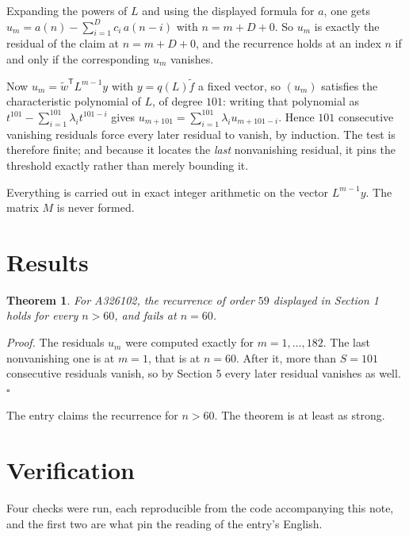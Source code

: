 \documentclass[11pt]{article}
\newtheorem{theorem}{Theorem}
\theoremstyle{definition}
\begin{document}
Expanding the powers of $L$ and using the displayed formula for $a$, one gets $u_m = a(n) - \sum_{i=1}^{D} c_i\,a(n-i)$ with $n = m + D + 0$. So $u_m$ is exactly the residual of the claim at $n = m + D + 0$, and the recurrence holds at an index $n$ if and only if the corresponding $u_m$ vanishes.

Now $u_m = \tilde w^{\mathsf T} L^{m-1} y$ with $y = q(L)\tilde f$ a fixed vector, so $(u_m)$ satisfies the characteristic polynomial of $L$, of degree $101$: writing that polynomial as $t^{101} - \sum_{i=1}^{101} \lambda_i t^{101-i}$ gives $u_{m+101} = \sum_{i=1}^{101} \lambda_i u_{m+101-i}$. Hence $101$ consecutive vanishing residuals force every later residual to vanish, by induction. The test is therefore finite; and because it locates the {\itshape last} nonvanishing residual, it pins the threshold exactly rather than merely bounding it.

Everything is carried out in exact integer arithmetic on the vector $L^{m-1}y$. The matrix $M$ is never formed.

\section{Results}

\begin{theorem} For A326102, the recurrence of order $59$ displayed in Section 1 holds for every $n > 60$, and fails at $n = 60$.\end{theorem}

{\itshape Proof.} The residuals $u_m$ were computed exactly for $m = 1,\dots,182$. The last nonvanishing one is at $m = 1$, that is at $n = 60$. After it, more than $S = 101$ consecutive residuals vanish, so by Section 5 every later residual vanishes as well. $\square$

The entry claims the recurrence for $n > 60$. The theorem is at least as strong.

\section{Verification}

Four checks were run, each reproducible from the code accompanying this note, and the first two are what pin the reading of the entry's English.
\end{document}
